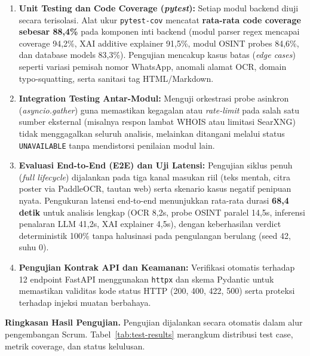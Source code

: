 \documentclass[12pt,a4paper]{article}
\begin{document}
\begin{enumerate}[label=\textbf{\arabic*.}]
\item \textbf{Unit Testing dan Code Coverage (\textit{pytest}):} Setiap modul backend diuji secara terisolasi.
      Alat ukur \texttt{pytest-cov} mencatat \textbf{rata-rata code coverage sebesar 88,4\%} pada komponen inti backend
      (modul parser regex mencapai coverage 94,2\%, XAI additive explainer 91,5\%, modul OSINT probes 84,6\%,
      dan database models 83,3\%). Pengujian mencakup kasus batas (\textit{edge cases}) seperti variasi pemisah nomor WhatsApp,
      anomali alamat OCR, domain typo-squatting, serta sanitasi tag HTML/Markdown.
\item \textbf{Integration Testing Antar-Modul:} Menguji orkestrasi probe asinkron (\textit{asyncio.gather})
      guna memastikan kegagalan atau \textit{rate-limit} pada salah satu sumber eksternal (misalnya respon lambat WHOIS
      atau limitasi SearXNG) tidak menggagalkan seluruh analisis, melainkan ditangani melalui status \texttt{UNAVAILABLE}
      tanpa mendistorsi penilaian modul lain.
\item \textbf{Evaluasi End-to-End (E2E) dan Uji Latensi:} Pengujian siklus penuh (\textit{full lifecycle})
      dijalankan pada tiga kanal masukan riil (teks mentah, citra poster via PaddleOCR, tautan web) serta skenario kasus negatif
      penipuan nyata. Pengukuran latensi end-to-end menunjukkan rata-rata durasi \textbf{68,4 detik} untuk analisis lengkap
      (OCR 8,2s, probe OSINT paralel 14,5s, inferensi penalaran LLM 41,2s, XAI explainer 4,5s), dengan keberhasilan verdict
      deterministik 100\% tanpa halusinasi pada pengulangan berulang (seed 42, suhu 0).
\item \textbf{Pengujian Kontrak API dan Keamanan:} Verifikasi otomatis terhadap 12 endpoint FastAPI menggunakan
      \texttt{httpx} dan skema Pydantic untuk memastikan validitas kode status HTTP (200, 400, 422, 500) serta proteksi
      terhadap injeksi muatan berbahaya.
\end{enumerate}

\textbf{Ringkasan Hasil Pengujian.} Pengujian dijalankan secara otomatis dalam alur pengembangan Scrum.
Tabel~\ref{tab:test-results} merangkum distribusi test case, metrik coverage, dan status kelulusan.
\end{document}
